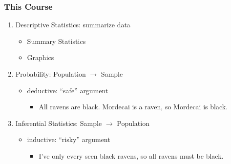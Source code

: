 
%
%
%
%
%
%


\begin{frame}

\frametitle{This Course}

\begin{enumerate}
	\item Descriptive Statistics: summarize data
		\begin{itemize}
			\item Summary Statistics
			\item Graphics
		\end{itemize}
	\item Probability: Population $\rightarrow$ Sample
		\begin{itemize}
			\item deductive: ``safe'' argument
				\begin{itemize}
					\item All ravens are black. Mordecai is a raven, so Mordecai is black.
				\end{itemize}
		\end{itemize}
	\item Inferential Statistics: Sample $\rightarrow$ Population
		\begin{itemize}
			\item inductive: ``risky'' argument
				\begin{itemize}
					\item I've only every seen black ravens, so all ravens must be black.
				\end{itemize}
		 \end{itemize}
\end{enumerate}


\end{frame}
